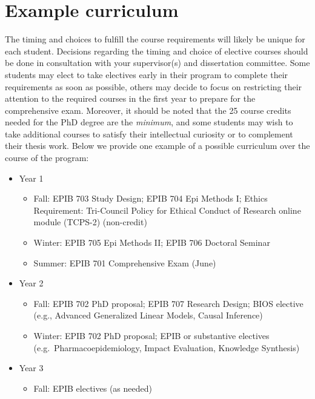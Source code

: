 \documentclass[
  openany]{book}
\providecommand{\tightlist}{%
  \setlength{\itemsep}{0pt}\setlength{\parskip}{0pt}}
\begin{document}
\hypertarget{example-curriculum}{%
\section{Example curriculum}\label{example-curriculum}}

The timing and choices to fulfill the course requirements will likely be unique for each student. Decisions regarding the timing and choice of elective courses should be done in consultation with your supervisor(s) and dissertation committee. Some students may elect to take electives early in their program to complete their requirements as soon as possible, others may decide to focus on restricting their attention to the required courses in the first year to prepare for the comprehensive exam. Moreover, it should be noted that the 25 course credits needed for the PhD degree are the \emph{minimum}, and some students may wish to take additional courses to satisfy their intellectual curiosity or to complement their thesis work. Below we provide one example of a possible curriculum over the course of the program:

\begin{itemize}
\tightlist
\item
  Year 1

  \begin{itemize}
  \tightlist
  \item
    Fall: EPIB 703 Study Design; EPIB 704 Epi Methods I; Ethics Requirement: Tri-Council Policy for Ethical Conduct of Research online module (TCPS-2) (non-credit)\\
  \item
    Winter: EPIB 705 Epi Methods II; EPIB 706 Doctoral Seminar
  \item
    Summer: EPIB 701 Comprehensive Exam (June)
  \end{itemize}
\item
  Year 2

  \begin{itemize}
  \tightlist
  \item
    Fall: EPIB 702 PhD proposal; EPIB 707 Research Design; BIOS elective (e.g., Advanced Generalized Linear Models, Causal Inference)
  \item
    Winter: EPIB 702 PhD proposal; EPIB or substantive electives (e.g.~Pharmacoepidemiology, Impact Evaluation, Knowledge Synthesis)
  \end{itemize}
\item
  Year 3

  \begin{itemize}
  \tightlist
  \item
    Fall: EPIB electives (as needed)
  \end{itemize}
\end{itemize}
\end{document}
